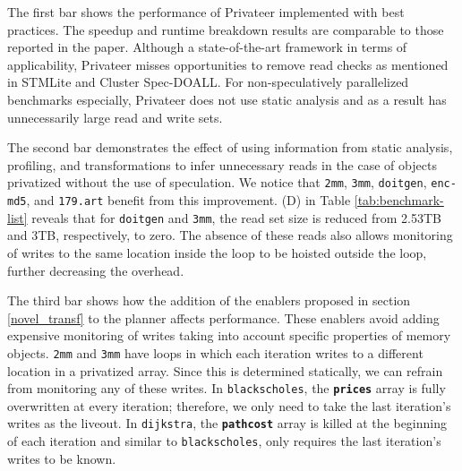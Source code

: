 The first bar shows the performance of Privateer implemented with best practices.
The speedup and runtime breakdown results are comparable to those reported
in the paper. Although a state-of-the-art framework in terms of applicability,
Privateer misses opportunities to remove read checks as mentioned in
STMLite\cite{mehrara:09:stmlite} and Cluster Spec-DOALL\cite{kim:12:cgo}.
For non-speculatively parallelized benchmarks especially, Privateer does not use
static analysis and as a result has unnecessarily large read and write
sets.
%

The second bar demonstrates the effect of using information from static
analysis, profiling, and transformations to infer unnecessary reads in the
case of objects privatized without the use of speculation. We notice
that \texttt{2mm}, \texttt{3mm}, \texttt{doitgen}, \texttt{enc-md5}, and
\texttt{179.art} benefit from this improvement. (D) in Table
\ref{tab:benchmark-list} reveals that for \texttt{doitgen} and \texttt{3mm},
the read set size is reduced from 2.53TB and 3TB, respectively, to zero.
The absence of these reads also allows monitoring of writes to the same
location inside the loop to be hoisted outside the loop, further decreasing
the overhead.
%

The third bar shows how the addition of the enablers proposed in section
\ref{novel_transf} to the planner affects performance. These enablers
avoid adding expensive monitoring of writes taking into account specific
properties of memory objects. \texttt{2mm} and \texttt{3mm} have loops in
which each iteration writes to a different location in a privatized array.
Since this is determined statically, we can refrain from monitoring any of
these writes. In \texttt{blackscholes}, the \texttt{\textbf{prices}} array
is fully overwritten at every iteration; therefore, we only need to take
the last iteration's writes as the liveout. In \texttt{dijkstra},
the \texttt{\textbf{pathcost}} array is killed at the beginning of each
iteration and similar to \texttt{blackscholes}, only requires the last
iteration's writes to be known.


